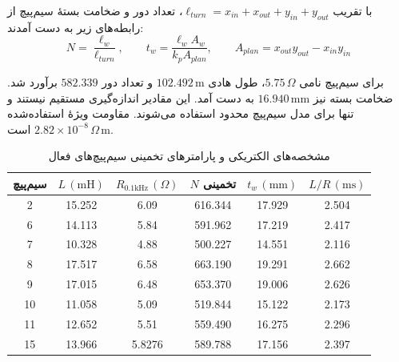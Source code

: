 با تقریب $\ell_{turn}=x_{in}+x_{out}+y_{in}+y_{out}$، تعداد دور و ضخامت بستهٔ سیم‌پیچ از رابطه‌های زیر به دست آمدند:
\begin{equation}
	N=\frac{\ell_w}{\ell_{turn}},
	\qquad
	t_w=\frac{\ell_wA_w}{k_pA_{plan}},
	\qquad
	A_{plan}=x_{out}y_{out}-x_{in}y_{in}
	\label{eq:method-winding-inference}
\end{equation}

برای سیم‌پیچ نامی $5.75\,\Omega$، طول هادی $102.492\,\mathrm m$ و تعداد دور $582.339$ برآورد شد. ضخامت بسته نیز $16.940\,\mathrm{mm}$ به دست آمد. این مقادیر اندازه‌گیری مستقیم نیستند و تنها برای مدل سیم‌پیچ محدود استفاده می‌شوند. مقاومت ویژهٔ استفاده‌شده $2.82\times10^{-8}\,\Omega\,\mathrm m$ است.

\begin{table}[!htbp]
	\centering
	\scriptsize
	\caption{مشخصه‌های الکتریکی و پارامترهای تخمینی سیم‌پیچ‌های فعال}
	\label{tab:method-active-coil-properties}
	\begin{tabular}{|c|c|c|c|c|c|}
		\hline
		\textbf{سیم‌پیچ} & $L\,(\mathrm{mH})$ & $R_{0.1\mathrm{kHz}}\,(\Omega)$ & $N$ تخمینی & $t_w\,(\mathrm{mm})$ & $L/R\,(\mathrm{ms})$\\ \hline
		2&15.252&6.09&616.344&17.929&2.504\\ \hline
		6&14.113&5.84&591.962&17.219&2.417\\ \hline
		7&10.328&4.88&500.227&14.551&2.116\\ \hline
		8&17.517&6.58&663.190&19.291&2.662\\ \hline
		9&17.015&6.48&653.370&19.006&2.626\\ \hline
		10&11.058&5.09&519.844&15.122&2.173\\ \hline
		11&12.652&5.51&559.490&16.275&2.296\\ \hline
		15&13.966&5.8276&589.788&17.156&2.397\\ \hline
	\end{tabular}
\end{table}
